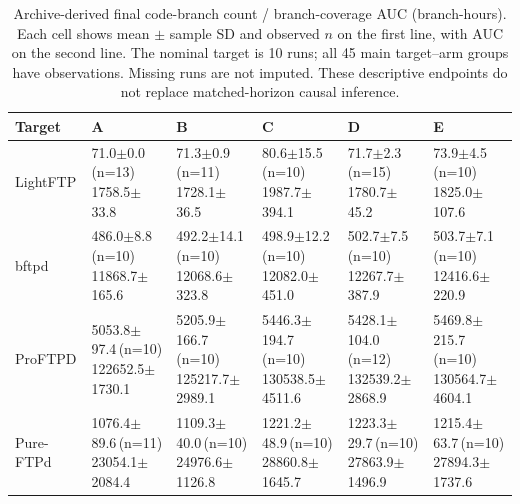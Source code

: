 \documentclass[final,5p,times,number]{elsarticle}
\begin{document}
\begin{table}[!tbp]
\centering\small
\caption{Archive-derived final code-branch count / branch-coverage AUC (branch-hours). Each cell shows mean $\pm$ sample SD and observed $n$ on the first line, with AUC on the second line. The nominal target is 10 runs; all 45 main target--arm groups have observations. Missing runs are not imputed. These descriptive endpoints do not replace matched-horizon causal inference.}
\label{tab:mainresults}
\begin{tabularx}{\textwidth}{l *{5}{>{\centering\arraybackslash}X}}
\toprule
Target & A & B & C & D & E \\
\midrule
LightFTP & \shortstack{71.0$\pm$0.0\,(n=13)\\1758.5$\pm$33.8} & \shortstack{71.3$\pm$0.9\,(n=11)\\1728.1$\pm$36.5} & \shortstack{80.6$\pm$15.5\,(n=10)\\1987.7$\pm$394.1} & \shortstack{71.7$\pm$2.3\,(n=15)\\1780.7$\pm$45.2} & \shortstack{73.9$\pm$4.5\,(n=10)\\1825.0$\pm$107.6} \\
\addlinespace[3pt]
bftpd & \shortstack{486.0$\pm$8.8\,(n=10)\\11868.7$\pm$165.6} & \shortstack{492.2$\pm$14.1\,(n=10)\\12068.6$\pm$323.8} & \shortstack{498.9$\pm$12.2\,(n=10)\\12082.0$\pm$451.0} & \shortstack{502.7$\pm$7.5\,(n=10)\\12267.7$\pm$387.9} & \shortstack{503.7$\pm$7.1\,(n=10)\\12416.6$\pm$220.9} \\
\addlinespace[3pt]
ProFTPD & \shortstack{5053.8$\pm$97.4\,(n=10)\\122652.5$\pm$1730.1} & \shortstack{5205.9$\pm$166.7\,(n=10)\\125217.7$\pm$2989.1} & \shortstack{5446.3$\pm$194.7\,(n=10)\\130538.5$\pm$4511.6} & \shortstack{5428.1$\pm$104.0\,(n=12)\\132539.2$\pm$2868.9} & \shortstack{5469.8$\pm$215.7\,(n=10)\\130564.7$\pm$4604.1} \\
\addlinespace[3pt]
Pure-FTPd & \shortstack{1076.4$\pm$89.6\,(n=11)\\23054.1$\pm$2084.4} & \shortstack{1109.3$\pm$40.0\,(n=10)\\24976.6$\pm$1126.8} & \shortstack{1221.2$\pm$48.9\,(n=10)\\28860.8$\pm$1645.7} & \shortstack{1223.3$\pm$29.7\,(n=10)\\27863.9$\pm$1496.9} & \shortstack{1215.4$\pm$63.7\,(n=10)\\27894.3$\pm$1737.6} \\

\end{tabularx}
\end{table}
\end{document}
